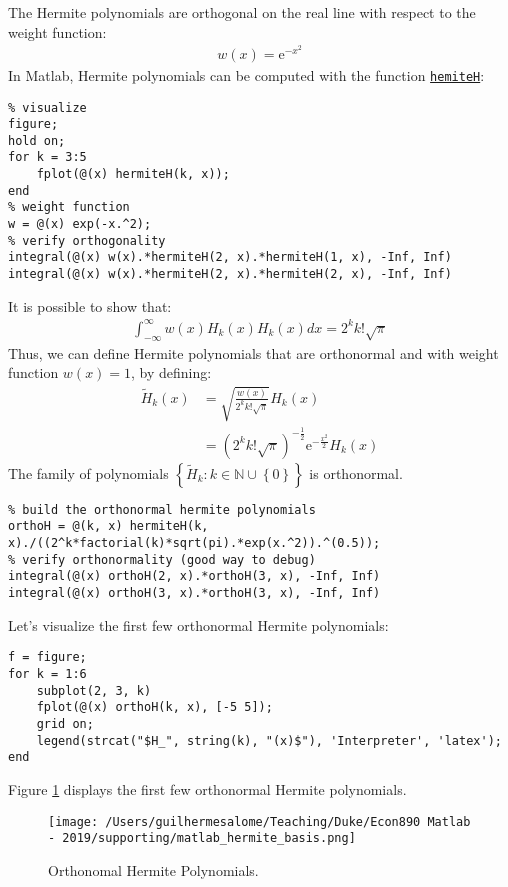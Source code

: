 \documentclass[12pt, a4paper]{article}
\newcommand{\e}[1]{\text{e}^{#1}}
\newcommand{\Set}[1]{\left\{#1\right\}}
\begin{document}
The Hermite polynomials are orthogonal on the real line with respect to the weight function:
\begin{align*}
w(x) = \e{-x^2}
\end{align*}
In Matlab, Hermite polynomials can be computed with the function \href{https://www.mathworks.com/help/symbolic/hermiteh.html}{\texttt{hemiteH}}:
\lstset{language=matlab,label= ,caption= ,captionpos=b,firstnumber=1,numbers=left,style=Matlab-editor}
\begin{lstlisting}
% visualize
figure;
hold on;
for k = 3:5
    fplot(@(x) hermiteH(k, x));
end
% weight function
w = @(x) exp(-x.^2);
% verify orthogonality
integral(@(x) w(x).*hermiteH(2, x).*hermiteH(1, x), -Inf, Inf)
integral(@(x) w(x).*hermiteH(2, x).*hermiteH(2, x), -Inf, Inf)
\end{lstlisting}
It is possible to show that:
\begin{align*}
\int_{-\infty}^{\infty}w(x)H_k(x)H_k(x)dx=2^kk!\sqrt{\pi}
\end{align*}
Thus, we can define Hermite polynomials that are orthonormal and with weight function \(w(x)=1\), by defining:
\begin{align*}
\tilde{H}_k(x)&=\sqrt{\frac{w(x)}{2^kk!\sqrt{\pi}}}H_k(x)\\
&=(2^kk!\sqrt{\pi})^{-\frac{1}{2}}\e{-\frac{x^2}{2}}H_k(x)
\end{align*}
The family of polynomials \(\Set{\tilde{H}_k:k\in\mathbb{N}\cup\Set{0}}\) is orthonormal.
\lstset{language=matlab,label= ,caption= ,captionpos=b,firstnumber=1,numbers=left,style=Matlab-editor}
\begin{lstlisting}
% build the orthonormal hermite polynomials
orthoH = @(k, x) hermiteH(k, x)./((2^k*factorial(k)*sqrt(pi).*exp(x.^2)).^(0.5));
% verify orthonormality (good way to debug)
integral(@(x) orthoH(2, x).*orthoH(3, x), -Inf, Inf)
integral(@(x) orthoH(3, x).*orthoH(3, x), -Inf, Inf)
\end{lstlisting}

Let's visualize the first few orthonormal Hermite polynomials:
\lstset{language=matlab,label= ,caption= ,captionpos=b,firstnumber=1,numbers=left,style=Matlab-editor}
\begin{lstlisting}
f = figure;
for k = 1:6
    subplot(2, 3, k)
    fplot(@(x) orthoH(k, x), [-5 5]);
    grid on;
    legend(strcat("$H_", string(k), "(x)$"), 'Interpreter', 'latex');
end
\end{lstlisting}
Figure \ref{fig:org3726ce7} displays the first few orthonormal Hermite polynomials.
\begin{figure}[H]
\centering
\texttt{[image: /Users/guilhermesalome/Teaching/Duke/Econ890 Matlab - 2019/supporting/matlab\_hermite\_basis.png]}
\caption{\label{fig:org3726ce7}
Orthonomal Hermite Polynomials.}
\end{figure}
\end{document}
